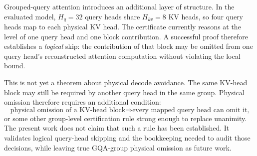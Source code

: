 Grouped-query attention introduces an additional layer of structure. In the evaluated model, \(H_q=32\) query heads share \(H_{kv}=8\) KV heads, so four query heads map to each physical KV head. The certificate currently reasons at the level of one query head and one block contribution. A successful proof therefore establishes a \emph{logical} skip: the contribution of that block may be omitted from one query head's reconstructed attention computation without violating the local bound.

This is not yet a theorem about physical decode avoidance. The same KV-head block may still be required by another query head in the same group. Physical omission therefore requires an additional condition:
\begin{equation}
  \text{physical omission of a KV-head block}
  \Longrightarrow
  \text{every mapped query head can omit it,}
\end{equation}
or some other group-level certification rule strong enough to replace unanimity. The present work does not claim that such a rule has been established. It validates logical query-head skipping and the bookkeeping needed to audit those decisions, while leaving true GQA-group physical omission as future work.
